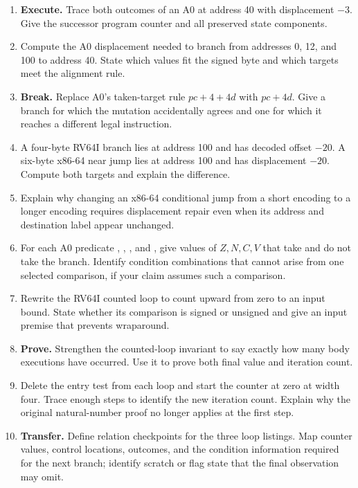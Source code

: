 \begin{enumerate}
\item \textbf{Execute.} Trace both outcomes of an A0  at
address 40 with displacement \(-3\). Give the successor program counter and
all preserved state components.

\item Compute the A0 displacement needed to branch from addresses 0, 12, and
100 to address 40. State which values fit the signed byte and which targets
meet the alignment rule.

\item \textbf{Break.} Replace A0's taken-target rule \(pc+4+4d\) with
\(pc+4d\). Give a branch for which the mutation accidentally agrees and one
for which it reaches a different legal instruction.

\item A four-byte RV64I branch lies at address 100 and has decoded offset
\(-20\). A six-byte x86-64 near jump lies at address 100 and has displacement
\(-20\). Compute both targets and explain the difference.

\item Explain why changing an x86-64 conditional jump from a short encoding
to a longer encoding requires displacement repair even when its address and
destination label appear unchanged.

\item For each A0 predicate , , , and ,
give values of \(Z,N,C,V\) that take and do not take the branch. Identify
condition combinations that cannot arise from one selected comparison, if
your claim assumes such a comparison.

\item Rewrite the RV64I counted loop to count upward from zero to an input
bound. State whether its comparison is signed or unsigned and give an input
premise that prevents wraparound.

\item \textbf{Prove.} Strengthen the counted-loop invariant to say exactly
how many body executions have occurred. Use it to prove both final value and
iteration count.

\item Delete the entry test from each loop and start the counter at zero at
width four. Trace enough steps to identify the new iteration count. Explain
why the original natural-number proof no longer applies at the first step.

\item \textbf{Transfer.} Define relation checkpoints for the three loop
listings. Map counter values, control locations, outcomes, and the condition
information required for the next branch; identify scratch or flag state that
the final observation may omit.


\end{enumerate}
